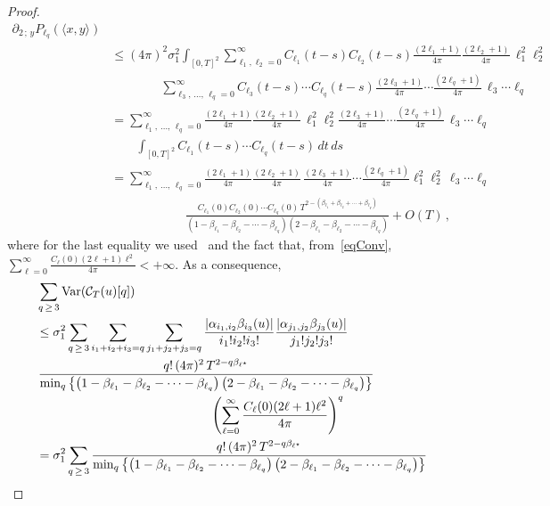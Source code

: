 \documentclass[10pt]{amsart}
\theoremstyle{definition}\newtheorem{defi}[theo]{Definition}\newtheorem{rema}[theo]{Remark}\newtheorem{exam}[theo]{Example}\newtheorem{exem}[theo]{Example}\newtheorem{nota}[theo]{Notation}
\newcommand{\clC}{\mathcal{C}}
\DeclareMathOperator{\Var}{Var}
\begin{document}
\begin{proof}
\begin{align*}
\partial_{2\,;\,y}P_{\ell_q}(\langle x,y \rangle) \\
& \leq(4\pi)^2\sigma _{1}^{2} \int_{[0,T]^2}
\sum_{\ell_1,\ell_2=0}^\infty C_{\ell_1}(t-s)C_{\ell_2}(t-s)\frac{(2\ell_1+1) }{4\pi}\frac{(2\ell_2+1)}{4\pi}\,\ell_1^2 \ell_2^2 \\
&\qquad\qquad \sum_{\ell_3,\,\dots,\,\ell_q=0}^\infty C_{\ell_3}(t-s)\cdots C_{\ell_q}(t-s)\frac{(2\ell_3+1)}{4\pi}\cdots\frac{(2\ell_q+1)}{4\pi}\,
\ell_3 \cdots \ell_q \\
& = \sum_{\ell_1,\,\dots,\,\ell_q=0}^\infty\frac{ (2\ell_1+1)}{4\pi}\frac{(2\ell_2+1)}{4\pi}\,\ell_1^2 \ell_2^2 \frac{ (2\ell_3+1)}{4\pi}\cdots\frac{(2\ell_q+1)}{4\pi}\, \ell_3 \cdots \ell_q
\\
&\qquad \int_{[0,T]^2} C_{\ell_1}(t-s)\cdots C_{\ell_q}(t-s)\,dt\,ds \\
&= \sum_{\ell_1,\,\dots,\,\ell_q=0}^\infty\frac{ (2\ell_1+1)}{4\pi}\frac{(2\ell_2+1)}{4\pi}\, \frac{(2\ell_3+1)}{4\pi}\cdots
\frac{(2\ell_q+1)}{4\pi} \ell_1^2 \ell_2^2 \, \ell_3 \cdots \ell_q
\\
&\qquad\qquad\qquad\frac{C_{\ell_1}(0)C_{\ell_2}(0)\cdots C_{\ell_q}(0)\,T^{2-\left(\beta_{\ell_1}+\beta_{\ell_2}+\cdots+\beta_{
\ell_q}\right)}}{\left(1-\beta_{\ell_1}-\beta_{\ell_2}-\cdots-\beta_{\ell_q}\right)\left(2-\beta_{
\ell_1}-\beta_{\ell_2}-\cdots-\beta_{\ell_q}\right)}+O(T)\,,
\end{align*}
\endgroup
where for the last equality we used~\cite[Lemma~4.11]{MRV:20} and the fact that, from~\eqref{eqConv}, $\sum_{\ell=0}^{\infty }\frac{C_{\ell }(0)(2\ell +1)\ell^2}{4\pi } <+\infty $. As a consequence,
\begingroup
\allowdisplaybreaks
\begin{align*}
&\sum_{q\,\geq\,3}\Var(\clC_{T}(u)[q])
\\
&\leq \sigma_{1}^{2}\sum_{q\,\geq\,3}\sum_{i_{1}+i_{2}+i_{3}=q}\sum_{j_{1}+j_{2}+j_{3}=q}\frac{\left|\alpha_{i_{1},i_{2}}\beta _{i_{3}}(u)\right|}{i_{1}!i_{2}!i_{3}!}\frac{\left|\alpha _{j_{1},j_{2}}\beta_{j_{3}}(u)\right|}{j_{1}!j_{2}!j_{3}!}
\\
&\,\frac{q!\,(4\pi)^{2}\,T^{2-q\beta_{\ell^{\star }}}}{
\min_{q}\left\{\left(1-\beta_{\ell_{1}}-\beta_{\ell_{2}}-\cdots -\beta_{\ell_{q}}\right)\left(2-\beta_{\ell _{1}}-\beta_{\ell_{2}}-\cdots -\beta_{\ell_{q}}\right)\right\}}
\\
& \mkern250mu\left(\sum_{\ell =0}^{\infty }\frac{C_\ell(0)(2\ell +1)\ell^{2}}{4\pi}\right)^{q}
\\
&=\sigma_{1}^{2}\sum_{q\,\geq\,3}\frac{q!\,(4\pi)^{2}\,T^{2-q\beta_{\ell^{\star }}}}{\min_{q}\left\{\left(1-\beta_{\ell _{1}}-\beta_{\ell _{2}}-\cdots -\beta_{\ell_{q}}\right)\left(2-\beta_{\ell_{1}}-\beta_{\ell _{2}}-\cdots -\beta_{\ell_{q}}\right)\right\}}

\end{align*}
\end{proof}
\end{document}
